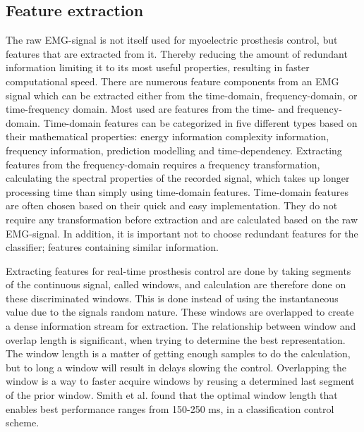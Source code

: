 \subsection{Feature extraction} \label{sec:fe}

The raw EMG-signal is not itself used for myoelectric prosthesis control, but features that are extracted from it. Thereby reducing the amount of redundant information limiting it to its most useful properties, resulting in faster computational speed. 
There are numerous feature components from an EMG signal which can be extracted either from the time-domain, frequency-domain, or time-frequency domain. Most used are features from the time- and frequency-domain. Time-domain features can be categorized in five different types based on their mathematical properties: energy information complexity information, frequency information, prediction modelling and time-dependency. Extracting features from the frequency-domain requires a frequency transformation, calculating the spectral properties of the recorded signal, which takes up longer processing time than simply using time-domain features. 
Time-domain features are often chosen based on their quick and easy implementation. They do not require any transformation before extraction and are calculated based on the raw EMG-signal. In addition, it is important not to choose redundant features for the classifier; features containing similar information. \cite{Phiny2012} 

Extracting features for real-time prosthesis control are done by taking segments of the continuous signal, called windows, and calculation are therefore done on these discriminated windows. This is done instead of using the instantaneous value due to the signals random nature. These windows are overlapped to create a dense information stream for extraction. The relationship between window and overlap length is significant, when trying to determine the best representation. The window length is a matter of getting enough samples to do the calculation, but to long a window will result in delays slowing the control. Overlapping the window is a way to faster acquire windows by reusing a determined last segment of the prior window. Smith et al. found that the optimal window length that enables best performance ranges from 150-250 ms, in a classification control scheme. \cite{Smith2014} 
